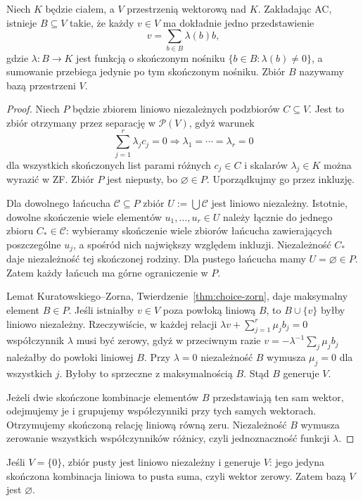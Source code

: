 \begin{twierdzenie}
\label{thm:choice-hamel-basis}
Niech $K$ będzie ciałem, a $V$ przestrzenią
wektorową nad $K$. Zakładając AC, istnieje
$B\subseteq V$ takie, że każdy $v\in V$
ma dokładnie jedno przedstawienie
\[
v=\sum_{b\in B}\lambda(b)b,
\]
gdzie $\lambda:B\to K$ jest funkcją
o skończonym nośniku
$\{b\in B:\lambda(b)\ne0\}$,
a sumowanie przebiega jedynie
po tym skończonym nośniku.
Zbiór $B$ nazywamy bazą przestrzeni $V$.
\end{twierdzenie}
\begin{proof}
Niech $P$ będzie zbiorem liniowo
niezależnych podzbiorów $C\subseteq V$.
Jest to zbiór otrzymany przez separację
w $\mathcal P(V)$, gdyż warunek
\[
\sum_{j=1}^r\lambda_jc_j=0
\Longrightarrow \lambda_1=\cdots=\lambda_r=0
\]
dla wszystkich skończonych list parami
różnych $c_j\in C$ i skalarów
$\lambda_j\in K$ można wyrazić w ZF.
Zbiór $P$ jest niepusty, bo $\varnothing\in P$.
Uporządkujmy go przez inkluzję.

Dla dowolnego łańcucha $\mathcal C\subseteq P$
zbiór $U:=\bigcup\mathcal C$ jest liniowo
niezależny. Istotnie, dowolne skończenie
wiele elementów $u_1,\ldots,u_r\in U$
należy łącznie do jednego zbioru
$C_*\in\mathcal C$: wybieramy
skończenie wiele zbiorów łańcucha
zawierających poszczególne $u_j$,
a spośród nich największy względem inkluzji.
Niezależność $C_*$ daje niezależność
tej skończonej rodziny. Dla pustego łańcucha
mamy $U=\varnothing\in P$.
Zatem każdy łańcuch ma górne ograniczenie w $P$.

Lemat Kuratowskiego--Zorna,
Twierdzenie~\ref{thm:choice-zorn},
daje maksymalny element $B\in P$.
Jeśli istniałby $v\in V$ poza
powłoką liniową $B$, to $B\cup\{v\}$
byłby liniowo niezależny.
Rzeczywiście, w każdej relacji
$\lambda v+\sum_{j=1}^r\mu_jb_j=0$
współczynnik $\lambda$ musi być zerowy,
gdyż w przeciwnym razie
$v=-\lambda^{-1}\sum_j\mu_jb_j$
należałby do powłoki liniowej $B$.
Przy $\lambda=0$ niezależność $B$
wymusza $\mu_j=0$ dla wszystkich $j$.
Byłoby to sprzeczne z maksymalnością $B$.
Stąd $B$ generuje $V$.

Jeżeli dwie skończone kombinacje
elementów $B$ przedstawiają ten sam wektor,
odejmujemy je i grupujemy współczynniki
przy tych samych wektorach.
Otrzymujemy skończoną relację liniową
równą zeru. Niezależność $B$
wymusza zerowanie wszystkich współczynników
różnicy, czyli jednoznaczność funkcji $\lambda$.
\end{proof}

\begin{przyklad}\label{ex:choice-zero-space}
Jeśli $V=\{0\}$, zbiór pusty jest
liniowo niezależny i generuje $V$:
jego jedyna skończona kombinacja liniowa
to pusta suma, czyli wektor zerowy.
Zatem bazą $V$ jest $\varnothing$.
\end{przyklad}
